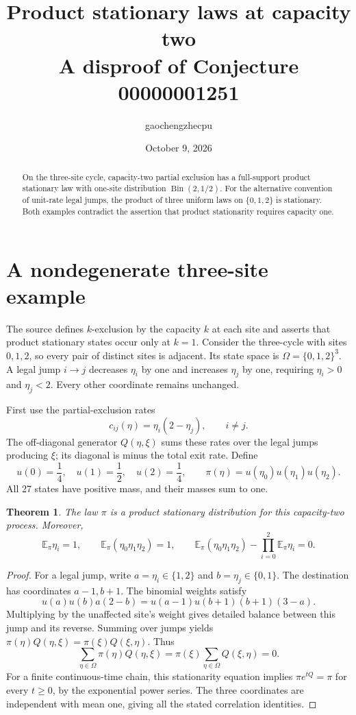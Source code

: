 \documentclass[11pt]{article}
\title{Product stationary laws at capacity two\\A disproof of Conjecture 00000001251}
\author{gaochengzhecpu}
\date{October 9, 2026}
\newtheorem{theorem}{Theorem}
\begin{document}
\maketitle
\begin{abstract}
On the three-site cycle, capacity-two partial exclusion has a full-support
product stationary law with one-site distribution $\operatorname{Bin}(2,1/2)$.
For the alternative convention of unit-rate legal jumps, the product of
three uniform laws on $\{0,1,2\}$ is stationary. Both examples contradict
the assertion that product stationarity requires capacity one.
\end{abstract}

\section{A nondegenerate three-site example}
The source defines $k$-exclusion by the capacity $k$ at each site and asserts
that product stationary states occur only at $k=1$. Consider the three-cycle
with sites $0,1,2$, so every pair of distinct sites is adjacent. Its state
space is $\Omega=\{0,1,2\}^3$. A legal jump $i\to j$ decreases $\eta_i$ by one
and increases $\eta_j$ by one, requiring $\eta_i>0$ and $\eta_j<2$.
Every other coordinate remains unchanged.

First use the partial-exclusion rates
\[
 c_{ij}(\eta)=\eta_i(2-\eta_j),\qquad i\ne j.
\]
The off-diagonal generator $Q(\eta,\xi)$ sums these rates over the legal
jumps producing $\xi$; its diagonal is minus the total exit rate.
Define
\[
 u(0)=\frac14,\quad u(1)=\frac12,\quad u(2)=\frac14,
 \qquad \pi(\eta)=u(\eta_0)u(\eta_1)u(\eta_2).
\]
All 27 states have positive mass, and their masses sum to one.

\begin{theorem}
The law $\pi$ is a product stationary distribution for this capacity-two
process. Moreover,
\[
 \mathbb E_\pi\eta_i=1,\qquad
 \mathbb E_\pi(\eta_0\eta_1\eta_2)=1,
 \qquad
 \mathbb E_\pi(\eta_0\eta_1\eta_2)-\prod_{i=0}^2\mathbb E_\pi\eta_i=0.
\]
\end{theorem}
\begin{proof}
For a legal jump, write $a=\eta_i\in\{1,2\}$ and
$b=\eta_j\in\{0,1\}$. The destination has coordinates $a-1,b+1$.
The binomial weights satisfy
\[
 u(a)u(b)a(2-b)=u(a-1)u(b+1)(b+1)(3-a).
\]
Multiplying by the unaffected site's weight gives detailed balance between
this jump and its reverse. Summing over jumps yields
$\pi(\eta)Q(\eta,\xi)=\pi(\xi)Q(\xi,\eta)$. Thus
\[
 \sum_{\eta\in\Omega}\pi(\eta)Q(\eta,\xi)
 =\pi(\xi)\sum_{\eta\in\Omega}Q(\xi,\eta)=0.
\]
For a finite continuous-time chain, this stationarity equation implies
$\pi e^{tQ}=\pi$ for every $t\geq0$, by the exponential power series.
The three coordinates are independent with mean one, giving all the
stated correlation identities.
\end{proof}
\end{document}
